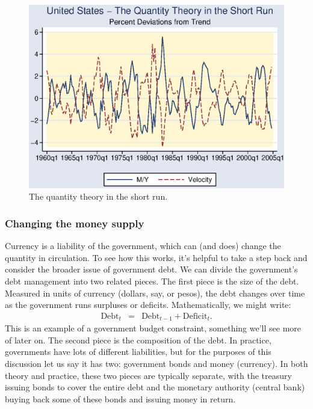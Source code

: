 \documentclass[letterpaper,12pt]{article}
\begin{document}
\begin{figure}[h]
    \centering
    \includegraphics[scale=0.8]{short_1.eps}
    \caption{The quantity theory in the short run.}
    \label{fig:quantity_short}
\end{figure}


\subsubsection*{Changing the money supply}

Currency is a liability of the government,
which can (and does) change the quantity in circulation.
To see how this works, it's helpful to take a
step back and consider the broader issue of government debt.
We can divide the government's debt management into two
related pieces.
The first piece is the size of the debt.
Measured in units of currency (dollars, say, or pesos),
the debt changes over time as the government runs surpluses
or deficits.
Mathematically, we might write:
\begin{eqnarray*}
    \mbox{Debt}_{t} &=& \mbox{Debt}_{t-1} + \mbox{Deficit}_t .
\end{eqnarray*}
This is an example of a government budget constraint, something
we'll see more of later on.
The second piece is the composition of the debt.
In practice, governments have lots of different liabilities,
but for the purposes of this discussion let us say it has two:
government bonds and money (currency).
In both theory and practice,
these two pieces are typically separate,
with the treasury issuing bonds to cover the entire debt
and the monetary authority (central bank) buying back
some of these bonds and issuing money in return.
\end{document}
